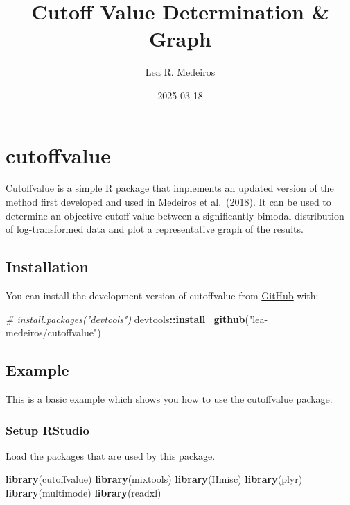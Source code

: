 \documentclass[
]{article}
\title{Cutoff Value Determination \& Graph}
\author{Lea R. Medeiros}
\date{2025-03-18}
\newenvironment{Shaded}{\begin{snugshade}}{\end{snugshade}}
\newcommand{\CommentTok}[1]{\textcolor[rgb]{0.56,0.35,0.01}{\textit{#1}}}
\newcommand{\FunctionTok}[1]{\textcolor[rgb]{0.13,0.29,0.53}{\textbf{#1}}}
\newcommand{\NormalTok}[1]{#1}
\newcommand{\SpecialCharTok}[1]{\textcolor[rgb]{0.81,0.36,0.00}{\textbf{#1}}}
\newcommand{\StringTok}[1]{\textcolor[rgb]{0.31,0.60,0.02}{#1}}
\begin{document}
\maketitle

\section{cutoffvalue}\label{cutoffvalue}

Cutoffvalue is a simple R package that implements an updated version of
the method first developed and used in Medeiros et al.~(2018). It can be
used to determine an objective cutoff value between a significantly
bimodal distribution of log-transformed data and plot a representative
graph of the results.

\subsection{Installation}\label{installation}

You can install the development version of cutoffvalue from
\href{https://github.com/lea-medeiros/cutoffvalue.git}{GitHub} with:

\begin{Shaded}
\begin{Highlighting}[]
\CommentTok{\# install.packages("devtools")}
\NormalTok{devtools}\SpecialCharTok{::}\FunctionTok{install\_github}\NormalTok{(}\StringTok{"lea{-}medeiros/cutoffvalue"}\NormalTok{)}
\end{Highlighting}
\end{Shaded}

\subsection{Example}\label{example}

This is a basic example which shows you how to use the cutoffvalue
package.

\subsubsection{Setup RStudio}\label{setup-rstudio}

Load the packages that are used by this package.

\begin{Shaded}
\begin{Highlighting}[]
\FunctionTok{library}\NormalTok{(cutoffvalue)}
\FunctionTok{library}\NormalTok{(mixtools)}
\FunctionTok{library}\NormalTok{(Hmisc)}
\FunctionTok{library}\NormalTok{(plyr)}
\FunctionTok{library}\NormalTok{(multimode)}
\FunctionTok{library}\NormalTok{(readxl)}
\end{Highlighting}
\end{Shaded}
\end{document}
